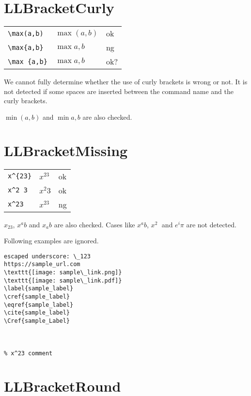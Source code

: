 \documentclass[a4paper]{article}
\newcommand{\tA}[1]{\textcolor{cA}{#1}}
\newcommand{\tC}[1]{\textcolor{cC}{#1}}
\newcommand{\tD}[1]{\textcolor{cD}{#1}}
\begin{document}
\section{LLBracketCurly}

\begin{table}[h]
	\centering
	\begin{tabular}{lll}
		\verb|\max(a,b)|  & $\max(a,b)$  & \tA{ok}  \\
		\verb|\max{a,b}|  & $\max{a,b}$  & \tD{ng}  \\
		\verb|\max {a,b}| & $\max {a,b}$ & \tC{ok?}
	\end{tabular}
\end{table}

We cannot fully determine whether the use of curly brackets is wrong or not.
It is not detected if some spaces are inserted between the command name and the curly brackets.

$\min(a,b)$ and $\min{a,b}$ are also checked.

\section{LLBracketMissing}

\begin{table}[H]
	\centering
	\begin{tabular}{lll}
		\verb|x^{23}| & $x^{23}$ & \tA{ok} \\
		\verb|x^2 3|  & $x^2 3$  & \tA{ok} \\
		\verb|x^23|   & $x^23$   & \tD{ng} \\
	\end{tabular}
\end{table}

$x_23$, $x^ab$ and $x_ab$ are also checked.
Cases like $x^a b$, $x^2\;$ and $e^i\pi$ are not detected.

Following examples are ignored.
\begin{verbatim}
escaped underscore: \_123
https://sample_url.com
\texttt{[image: sample\_link.png]}
\texttt{[image: sample\_link.pdf]}
\label{sample_label}
\cref{sample_label}
\eqref{sample_label}
\cite{sample_label}
\Cref{sample_Label}



% x^23 comment
\end{verbatim}

\section{LLBracketRound}
\end{document}
